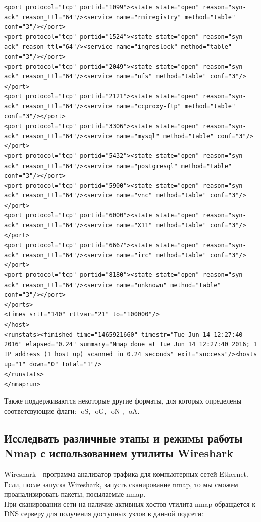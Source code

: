 \documentclass[10pt,a4paper,titlepage]{article}
\begin{document}
\begin{verbatim}
<port protocol="tcp" portid="1099"><state state="open" reason="syn-ack" reason_ttl="64"/><service name="rmiregistry" method="table" conf="3"/></port>
<port protocol="tcp" portid="1524"><state state="open" reason="syn-ack" reason_ttl="64"/><service name="ingreslock" method="table" conf="3"/></port>
<port protocol="tcp" portid="2049"><state state="open" reason="syn-ack" reason_ttl="64"/><service name="nfs" method="table" conf="3"/></port>
<port protocol="tcp" portid="2121"><state state="open" reason="syn-ack" reason_ttl="64"/><service name="ccproxy-ftp" method="table" conf="3"/></port>
<port protocol="tcp" portid="3306"><state state="open" reason="syn-ack" reason_ttl="64"/><service name="mysql" method="table" conf="3"/></port>
<port protocol="tcp" portid="5432"><state state="open" reason="syn-ack" reason_ttl="64"/><service name="postgresql" method="table" conf="3"/></port>
<port protocol="tcp" portid="5900"><state state="open" reason="syn-ack" reason_ttl="64"/><service name="vnc" method="table" conf="3"/></port>
<port protocol="tcp" portid="6000"><state state="open" reason="syn-ack" reason_ttl="64"/><service name="X11" method="table" conf="3"/></port>
<port protocol="tcp" portid="6667"><state state="open" reason="syn-ack" reason_ttl="64"/><service name="irc" method="table" conf="3"/></port>
<port protocol="tcp" portid="8180"><state state="open" reason="syn-ack" reason_ttl="64"/><service name="unknown" method="table" conf="3"/></port>
</ports>
<times srtt="140" rttvar="21" to="100000"/>
</host>
<runstats><finished time="1465921660" timestr="Tue Jun 14 12:27:40 2016" elapsed="0.24" summary="Nmap done at Tue Jun 14 12:27:40 2016; 1 IP address (1 host up) scanned in 0.24 seconds" exit="success"/><hosts up="1" down="0" total="1"/>
</runstats>
</nmaprun>
\end{verbatim}

Также поддерживаются некоторые другие форматы, для которых определены соответсвующие флаги: -oS, -oG, -oN , -oA.

\subsection{Исследвать различные этапы и режимы работы Nmap с использованием утилиты Wireshark}
Wireshark - программа-анализатор трафика для компьютерных сетей Ethernet. Если, после запуска Wireshark, запусть сканирование nmap, то мы сможем проанализировать пакеты, посылаемые nmap.\\

При сканировании сети на наличие активных хостов утилита nmap обращается к DNS серверу для получения доступных узлов в данной подсети:
\end{document}
